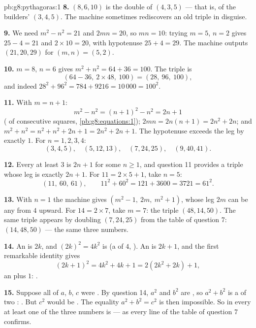 \begin{solution}{pb:g8:pythagoras:1}
\textbf{8.} $(8, 6, 10)$ is the double of $(4, 3, 5)$ --- that
is, of the builders' $(3, 4, 5)$. The machine sometimes
rediscovers an old triple in disguise.

\textbf{9.} We need $m^2 - n^2 = 21$ and $2mn = 20$, so
$mn = 10$: trying $m = 5$, $n = 2$ gives $25 - 4 = 21$ and
$2 \times 10 = 20$, with hypotenuse $25 + 4 = 29$. The machine
outputs $(21, 20, 29)$ for $(m, n) = (5, 2)$.

\textbf{10.} $m = 8$, $n = 6$ gives $m^2 + n^2 = 64 + 36 = 100$.
The triple is
\[
\left(64 - 36,\ 2 \times 48,\ 100\right) = (28,\ 96,\ 100),
\]
and indeed $28^2 + 96^2 = 784 + 9216 = 10\,000 = 100^2$.

\textbf{11.} With $m = n + 1$:
\[
m^2 - n^2 = (n + 1)^2 - n^2 = 2n + 1
\]
( of consecutive squares, \cref{pb:g8:equations:1});
$2mn = 2n(n + 1) = 2n^2 + 2n$; and
$m^2 + n^2 = n^2 + n^2 + 2n + 1 = 2n^2 + 2n + 1$. The hypotenuse
exceeds the  leg by exactly $1$. For $n = 1, 2, 3, 4$:
\[
(3, 4, 5), \quad (5, 12, 13), \quad (7, 24, 25), \quad
(9, 40, 41) .
\]

\textbf{12.} Every  at least $3$ is $2n + 1$ for some
$n \geq 1$, and question 11 provides a triple whose  leg is
exactly $2n + 1$. For $11 = 2 \times 5 + 1$, take $n = 5$:
\[
(11,\ 60,\ 61),
\qquad
11^2 + 60^2 = 121 + 3600 = 3721 = 61^2 .
\]

\textbf{13.} With $n = 1$ the machine gives
$\left(m^2 - 1,\ 2m,\ m^2 + 1\right)$, whose  leg $2m$ can be
any  from $4$ upward. For $14 = 2 \times 7$, take
$m = 7$: the triple $(48, 14, 50)$. The same triple appears by
doubling $(7, 24, 25)$ from the table of question 7:
$(14, 48, 50)$ --- the same three numbers.

\textbf{14.} An  is $2k$, and $(2k)^2 = 4k^2$ is 
(a  of $4$, ). An  is $2k + 1$, and the
first remarkable identity gives
\[
(2k + 1)^2 = 4k^2 + 4k + 1 = 2\left(2k^2 + 2k\right) + 1 ,
\]
an  plus $1$: .

\textbf{15.} Suppose all of $a$, $b$, $c$ were . By question
14, $a^2$ and $b^2$ are , so $a^2 + b^2$ is a  of two : \emph{}. But $c^2$ would be \emph{}. The equality
$a^2 + b^2 = c^2$ is then impossible. So in every  at least one of the three numbers is  --- as every
line of the table of question 7 confirms.
\end{solution}
